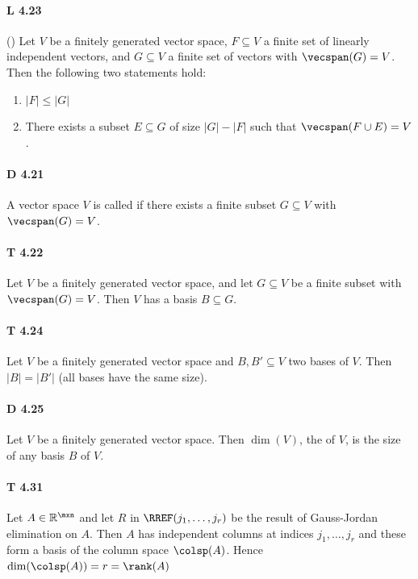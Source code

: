 \paragraph{L 4.23} () Let $V$ be a finitely generated vector
space, $F\subseteq V$ a finite set of linearly independent vectors, and
$G\subseteq V$ a finite set of vectors with $\vecspan(G)=V$. Then the following
two statements hold:
\begin{enumerate}
    \item $\lvert F\rvert\le\lvert G\rvert$

    \item There exists a subset $E\subseteq G$ of size $\lvert G\rvert - \lvert
        F\rvert$ such that $\vecspan(F\cup E)=V$.
\end{enumerate}

\paragraph{D 4.21} A vector space $V$ is called  if there exists a finite subset $G\subseteq V$ with $\vecspan(G)=V$.

\paragraph{T 4.22} Let $V$ be a finitely generated vector space, and let
$G\subseteq V$ be a finite subset with $\vecspan(G)=V$. Then $V$ has a basis
$B\subseteq G$.

\paragraph{T 4.24} Let $V$ be a finitely generated vector space and $B,B'\subseteq V$ two bases of $V$. Then $\lvert B\rvert = \lvert B'\rvert$ (all bases have the same size).

\paragraph{D 4.25} Let $V$ be a finitely generated vector space. Then
$\dim(V)$, the  of $V$, is the size of any basis $B$ of $V$.

\paragraph{T 4.31} Let $A\in\mathbb{R}^{\mxn}$ and let $R$ in
$\RREF(j_1,\dots,j_r)$ be the result of Gauss-Jordan elimination on $A$. Then
$A$ has independent columns at indices $j_1,\dots,j_r$ and these form a basis
of the column space $\colsp(A)$. Hence $\dim(\colsp(A))=r=\rank(A)$

